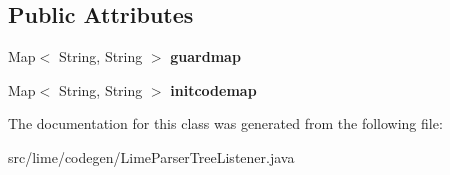 \subsection*{Public Attributes}
\begin{DoxyCompactItemize}
\item 
\mbox{\label{classlime_1_1codegen_1_1LimeParserTreeListener_a2935cbe639237155e0162d5e0293edb1}} 
Map$<$ String, String $>$ {\bfseries guardmap}
\item 
\mbox{\label{classlime_1_1codegen_1_1LimeParserTreeListener_a15ac41818f9bcd2e054cf88348c33a08}} 
Map$<$ String, String $>$ {\bfseries initcodemap}
\end{DoxyCompactItemize}


The documentation for this class was generated from the following file\+:\begin{DoxyCompactItemize}
\item 
src/lime/codegen/Lime\+Parser\+Tree\+Listener.\+java\end{DoxyCompactItemize}

